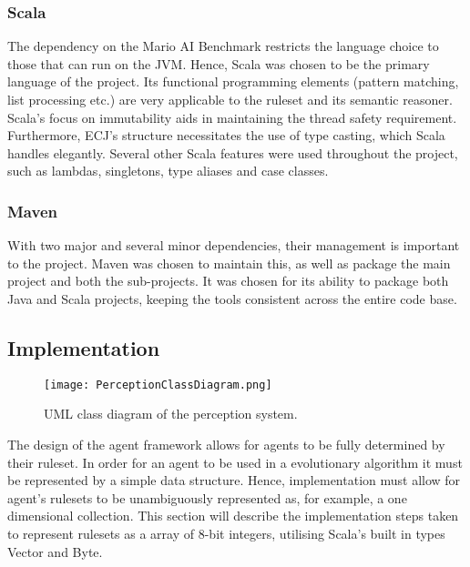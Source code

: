 \subsubsection{Scala}
\label{subsec:langchoice}
The dependency on the Mario AI Benchmark restricts the language choice to those that can run on the JVM. Hence, Scala was chosen to be the primary language of the project. Its functional programming elements (pattern matching, list processing etc.) are very applicable to the ruleset and its semantic reasoner. Scala's focus on immutability aids in maintaining the thread safety requirement. Furthermore, ECJ's structure necessitates the use of type casting, which Scala handles elegantly. Several other Scala features were used throughout the project, such as lambdas, singletons, type aliases and case classes. 

\subsubsection{Maven}
With two major and several minor dependencies, their management is important to the project. Maven was chosen to maintain this, as well as package the main project and both the sub-projects. It was chosen for its ability to package both Java and Scala projects, keeping the tools consistent across the entire code base.



\subsection{Implementation}

\begin{figure}[t]
	\centering
	\texttt{[image: PerceptionClassDiagram.png]}
	\caption{UML class diagram of the perception system.}
	\label{fig:percumlcd}
\end{figure}

The design of the agent framework allows for agents to be fully determined by their ruleset. In order for an agent to be used in a evolutionary algorithm it must be represented by a simple data structure. Hence, implementation must allow for agent's rulesets to be unambiguously represented as, for example, a one dimensional collection. This section will describe the implementation steps taken to represent rulesets as a array of 8-bit integers, utilising Scala's built in types Vector and Byte.

